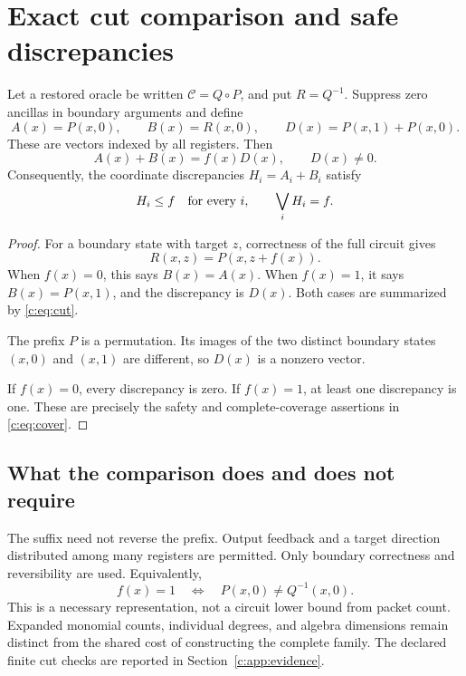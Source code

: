 \chapter{Exact cut comparison and safe discrepancies}
\label{c:ch:cut}
\begin{theorem}\label{c:thm:cut}
Let a restored oracle be written $\mathcal C=Q\circ P$, and put $R=Q^{-1}$. Suppress zero ancillas in boundary arguments and define
\[
 A(x)=P(x,0),\qquad B(x)=R(x,0),\qquad
 D(x)=P(x,1)+P(x,0).
\]
These are vectors indexed by all registers. Then
\begin{equation}\label{c:eq:cut}
 A(x)+B(x)=f(x)D(x),\qquad D(x)\ne0.
\end{equation}
Consequently, the coordinate discrepancies $H_i=A_i+B_i$ satisfy
\begin{equation}\label{c:eq:cover}
 H_i\le f\quad\hbox{for every }i,\qquad
 \bigvee_iH_i=f.
\end{equation}
\end{theorem}
\begin{proof}
For a boundary state with target $z$, correctness of the full circuit gives
\[
 R(x,z)=P(x,z+f(x)).
\]
When $f(x)=0$, this says $B(x)=A(x)$. When $f(x)=1$, it says $B(x)=P(x,1)$, and the discrepancy is $D(x)$. Both cases are summarized by \eqref{c:eq:cut}.

The prefix $P$ is a permutation. Its images of the two distinct boundary states $(x,0)$ and $(x,1)$ are different, so $D(x)$ is a nonzero vector.

If $f(x)=0$, every discrepancy is zero. If $f(x)=1$, at least one discrepancy is one. These are precisely the safety and complete-coverage assertions in \eqref{c:eq:cover}.
\end{proof}

\section{What the comparison does and does not require}
The suffix need not reverse the prefix. Output feedback and a target direction distributed among many registers are permitted. Only boundary correctness and reversibility are used. Equivalently,
\[
 f(x)=1\quad\Longleftrightarrow\quad P(x,0)\ne Q^{-1}(x,0).
\]
This is a necessary representation, not a circuit lower bound from packet count. Expanded monomial counts, individual degrees, and algebra dimensions remain distinct from the shared cost of constructing the complete family. The declared finite cut checks are reported in Section~\ref{c:app:evidence}.

